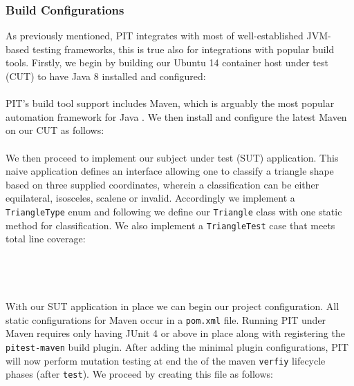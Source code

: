 \documentclass[a4paper]{article}
\begin{document}
\subsubsection{Build Configurations}
As previously mentioned, PIT integrates with most of well-established JVM-based testing frameworks, this is true also for integrations with popular build tools. Firstly, we begin by building our Ubuntu 14 container host under test (CUT) to have Java 8 installed and configured:
\\

\\

\noindent PIT's build tool support includes Maven, which is arguably the most popular automation framework for Java \citep{Tahchiev}. We then install and configure the latest Maven on our CUT as follows: 
\\

\\

\noindent We then proceed to implement our subject under test (SUT) application. This naive application defines an interface allowing one to classify a triangle shape based on three supplied coordinates, wherein a classification can be either equilateral, isosceles, scalene or invalid. Accordingly we implement a \lstinline$TriangleType$ enum and following we define our \lstinline$Triangle$ class with one static method for classification. We also implement a \lstinline$TriangleTest$ case that meets total line coverage:
\\

\\

\\
\\

\\

\noindent With our SUT application in place we can begin our project configuration. All static configurations for Maven occur in a \lstinline$pom.xml$ file. Running PIT under Maven requires only having JUnit 4 or above in place along with registering the \lstinline$pitest-maven$ build plugin. After adding the minimal plugin configurations, PIT will now perform mutation testing at end the of the maven \lstinline$verfiy$ lifecycle phases (after \lstinline$test$). We proceed by creating this file as follows: 
\\

\\
\end{document}
